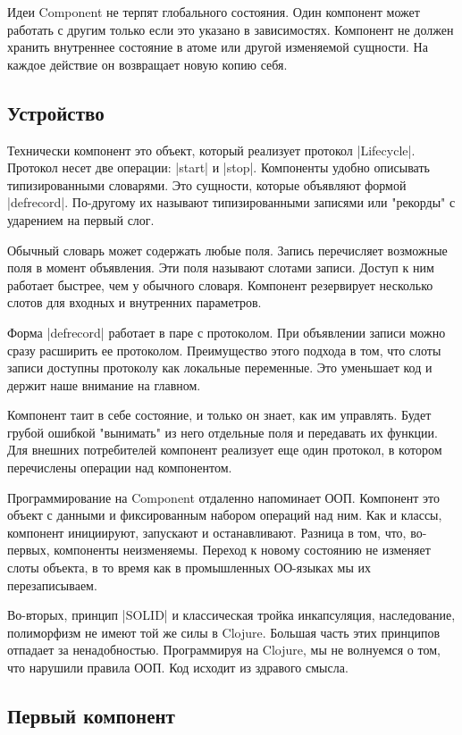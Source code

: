 Идеи Component не терпят глобального состояния. Один компонент может работать с
другим только если это указано в зависимостях. Компонент не должен хранить
внутреннее состояние в атоме или другой изменяемой сущности. На каждое действие
он возвращает новую копию себя.

\subsection{Устройство}

Технически компонент это объект, который реализует протокол
\spverb|Lifecycle|. Протокол несет две операции: \spverb|start| и \spverb|stop|. Компоненты удобно
описывать типизированными словарями. Это сущности, которые объявляют формой
\spverb|defrecord|. По-другому их называют типизированными записями или "рекорды" с
ударением на первый слог.

Обычный словарь может содержать любые поля. Запись перечисляет возможные поля в
момент объявления. Эти поля называют слотами записи. Доступ к ним работает
быстрее, чем у обычного словаря. Компонент резервирует несколько слотов для
входных и внутренних параметров.

Форма \spverb|defrecord| работает в паре с протоколом. При объявлении записи можно
сразу расширить ее протоколом. Преимущество этого подхода в том, что слоты
записи доступны протоколу как локальные переменные. Это уменьшает код и держит
наше внимание на главном.

Компонент таит в себе состояние, и только он знает, как им управлять. Будет
грубой ошибкой "вынимать" из него отдельные поля и передавать их функции. Для
внешних потребителей компонент реализует еще один протокол, в котором
перечислены операции над компонентом.

Программирование на Component отдаленно напоминает ООП. Компонент это объект с
данными и фиксированным набором операций над ним. Как и классы, компонент
инициируют, запускают и останавливают. Разница в том, что, во-первых, компоненты
неизменяемы. Переход к новому состоянию не изменяет слоты объекта, в то время
как в промышленных ОО-языках мы их перезаписываем.

Во-вторых, принцип \spverb|SOLID| и классическая тройка инкапсуляция, наследование,
полиморфизм не имеют той же силы в Clojure. Большая часть этих принципов
отпадает за ненадобностью. Программируя на Clojure, мы не волнуемся о том, что
нарушили правила ООП. Код исходит из здравого смысла.

\subsection{Первый компонент}

